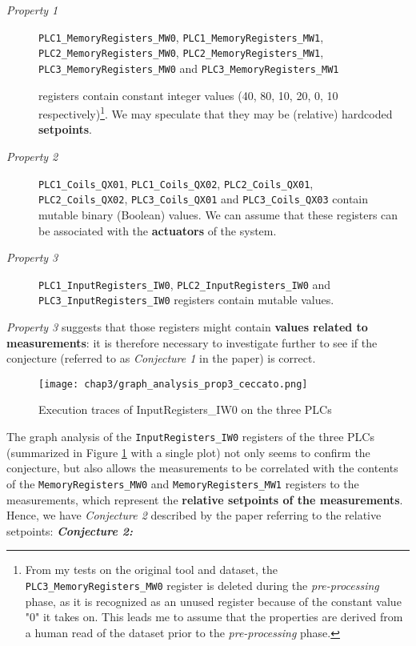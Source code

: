 \begin{description}
	\item[\textit{Property 1}] \texttt{PLC1\_MemoryRegisters\_MW0},  \texttt{PLC1\_MemoryRegisters\_MW1}, \\ \texttt{PLC2\_MemoryRegisters\_MW0},  \texttt{PLC2\_MemoryRegisters\_MW1}, \\ 
	\texttt{PLC3\_MemoryRegisters\_MW0} and 
	\texttt{PLC3\_MemoryRegisters\_MW1}
 
	registers contain constant integer values (40, 80, 10, 20, 0, 10 respectively)\footnote{From my tests on the original tool and dataset, the \texttt{PLC3\_MemoryRegisters\_MW0} register is deleted during the \textit{pre-processing} phase, as it is recognized as an unused register because of the constant value "0" it takes on. This leads me to assume that the properties are derived from a human read of the dataset prior to the \textit{pre-processing} phase.}. We may speculate that they may be (relative) hardcoded \textbf{setpoints}.
	
	\item[\textit{Property 2}] \texttt{PLC1\_Coils\_QX01}, \texttt{PLC1\_Coils\_QX02}, \texttt{PLC2\_Coils\_QX01}, \\ \texttt{PLC2\_Coils\_QX02}, \texttt{PLC3\_Coils\_QX01} and \texttt{PLC3\_Coils\_QX03} contain mutable binary (Boolean) values.
	We can assume that these registers can be associated with the \textbf{actuators} of the system.
	
	\item[\textit{Property 3}] \texttt{PLC1\_InputRegisters\_IW0},
	\texttt{PLC2\_InputRegisters\_IW0} and \\ \texttt{PLC3\_InputRegisters\_IW0} registers contain mutable values.
\end{description}

\textit{Property 3} suggests that those registers might contain \textbf{values related to measurements}: it is therefore necessary to investigate further to see if the conjecture (referred to as \textit{Conjecture 1} in the paper) is correct.

\begin{figure}[ht]
	\centering
	\texttt{[image: chap3/graph\_analysis\_prop3\_ceccato.png]}
	\caption{Execution traces of InputRegisters\_IW0 on the three PLCs}
	\label{fig:graph_analysis_prop3}
\end{figure}

The graph analysis of the \texttt{InputRegisters\_IW0} registers of the three PLCs (summarized in Figure \ref{fig:graph_analysis_prop3} with a single plot) not only seems to confirm the conjecture, but also allows the measurements to be correlated with the contents of the \texttt{MemoryRegisters\_MW0} and \texttt{MemoryRegisters\_MW1} registers to the measurements, which represent the \textbf{relative setpoints of the measurements}.\\
Hence, we have \textit{Conjecture 2} described by the paper referring to the relative setpoints:\newline \newline
\emph{\textbf{Conjecture 2:}} 


